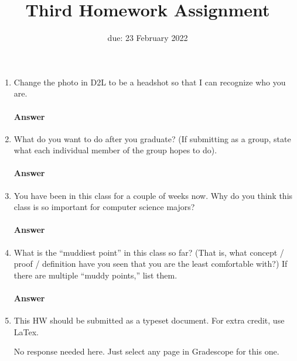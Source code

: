 \renewcommand{\hwnum}{3}

\title{Third Homework Assignment}
\date{due: 23 February 2022}
\maketitle




\begin{enumerate}

    \item Change the photo in D2L to be a headshot so that I can recognize who you are.
        \paragraph{Answer}

    \item What do you want to do after you graduate? (If submitting as a group,
        state what each individual member of the group hopes to do).
        \paragraph{Answer}
        \todo{}

    \item You have been in this class for a couple of weeks now.  Why do you
        think this class is so important for computer science majors?
        \paragraph{Answer}
        \todo{}

    \item What is the ``muddiest point'' in this class so far?  (That is, what
        concept / proof / definition have you seen that you are the least
        comfortable with?)  If there are multiple ``muddy points,'' list them.
        \paragraph{Answer}
        \todo{}

    \item This HW should be submitted as a typeset document. For extra credit,
        use LaTex.

        No response needed here. Just select any page in Gradescope
        for this one.

\end{enumerate}

